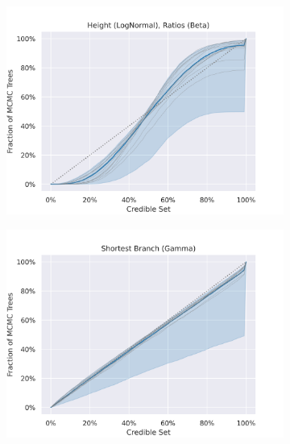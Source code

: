 \documentclass[10pt,letterpaper]{article}
\begin{document}
\begin{figure}[h!]
	\caption{This figure shows the credible-region plots for different datasets and distributions. The plot shows the fraction of MCMC trees contained in the smallest $\gamma$-credible region for different $\gamma$. The closer the resulting line is to the $x=y$ line the better. The blue line shows the median line for the datasets; 95 \% of all datasets fall into the blue region. The grey lines the credible region plots for 10 random datasets.}
	
	\centering
	\begin{subfigure}[b]{0.45\textwidth}
		\centering
		\includegraphics[width=\textwidth]{figures/yule-200-ccd1-credible-sets-Height (LogNormal), Ratios (Beta).png}
	\end{subfigure}
	\begin{subfigure}[b]{0.45\textwidth}
		\centering
		\includegraphics[width=\textwidth]{figures/yule-200-ccd1-credible-sets-Shortest Branch (Gamma).png}
	\end{subfigure}
	

\end{figure}
\end{document}
